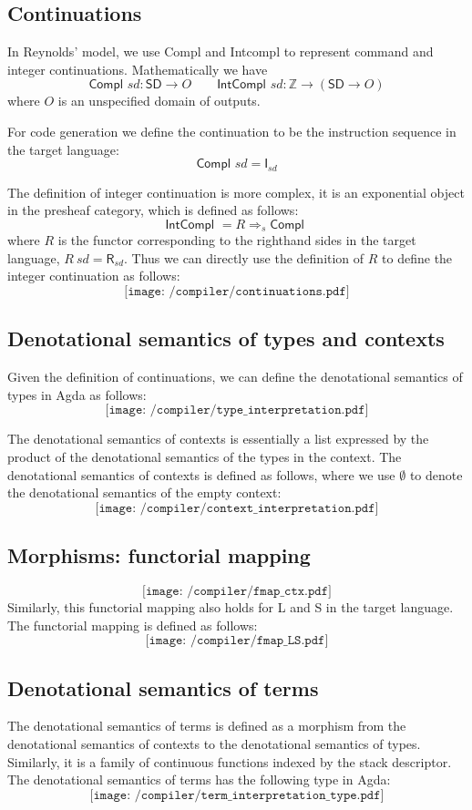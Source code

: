 \documentclass[12pt,twoside,a4paper]{report}
\theoremstyle{definition}
\theoremstyle{definition}
\theoremstyle{definition}
\theoremstyle{definition}
\newcommand{\bZ}{\mathbb{Z}}
\begin{document}
    \subsection{Continuations}
    In Reynolds' model, we use \textsf{Compl} and \textsf{Intcompl} to represent command and integer continuations. Mathematically we have
    \[\textsf{Compl } sd : \mathsf{SD} \to O \qquad \textsf{IntCompl } sd : \bZ \to (\mathsf{SD} \to O)\]
    where $O$ is an unspecified domain of outputs.

    For code generation we define the continuation to be the instruction sequence in the target language:
    \[\textsf{Compl } sd = \textsf{I}_{sd}\]

    The definition of integer continuation is more complex, it is an exponential object in the presheaf category, which is defined as follows:
    \[\textsf{IntCompl } = R \Rightarrow_s \textsf{Compl } \]
    where $R$ is the functor corresponding to the righthand sides in the target language, $R\ sd = \textsf{R}_{sd}$. Thus we can directly use the definition of $R$ to define the integer continuation as follows:
    \[\texttt{[image: /compiler/continuations.pdf]}\]

    \subsection{Denotational semantics of types and contexts}
    Given the definition of continuations, we can define the denotational semantics of types in Agda as follows:
    \[\texttt{[image: /compiler/type\_interpretation.pdf]}\]

    The denotational semantics of contexts is essentially a list expressed by the product of the denotational semantics of the types in the context. The denotational semantics of contexts is defined as follows, where we use $\emptyset$ to denote the denotational semantics of the empty context:
    \[\texttt{[image: /compiler/context\_interpretation.pdf]}\]

    \subsection{Morphisms: functorial mapping}
    \[\texttt{[image: /compiler/fmap\_ctx.pdf]}\]
    Similarly, this functorial mapping also holds for \textsf{L} and \textsf{S} in the target language. The functorial mapping is defined as follows:
    \[\texttt{[image: /compiler/fmap\_LS.pdf]}\]

    \subsection{Denotational semantics of terms}
    The denotational semantics of terms is defined as a morphism from the denotational semantics of contexts to the denotational semantics of types. Similarly, it is a family of continuous functions indexed by the stack descriptor. The denotational semantics of terms has the following type in Agda:
    \[\texttt{[image: /compiler/term\_interpretation\_type.pdf]}\]
\end{document}
